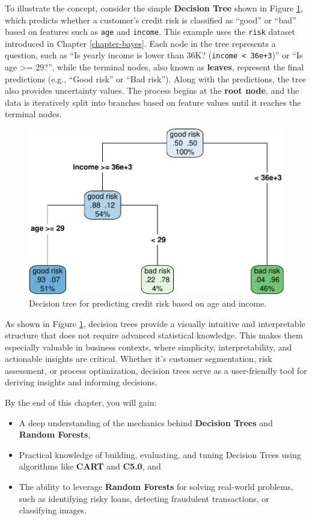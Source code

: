 \documentclass[
]{book}
\newcommand{\passthrough}[1]{#1}
\providecommand{\tightlist}{%
  \setlength{\itemsep}{0pt}\setlength{\parskip}{0pt}}
\theoremstyle{definition}
\theoremstyle{definition}
\theoremstyle{definition}
\theoremstyle{definition}
\theoremstyle{remark}
\begin{document}
To illustrate the concept, consider the simple \textbf{Decision Tree} shown in Figure \ref{fig:tree-0}, which predicts whether a customer's credit risk is classified as ``good'' or ``bad'' based on features such as \passthrough{\lstinline!age!} and \passthrough{\lstinline!income!}. This example uses the \passthrough{\lstinline!risk!} dataset introduced in Chapter \ref{chapter-bayes}. Each node in the tree represents a question, such as ``Is yearly income is lower than 36K? (\passthrough{\lstinline!income < 36e+3!})'' or ``Is age \textgreater= 29?'', while the terminal nodes, also known as \textbf{leaves}, represent the final predictions (e.g., ``Good risk'' or ``Bad risk''). Along with the predictions, the tree also provides uncertainty values. The process begins at the \textbf{root node}, and the data is iteratively split into branches based on feature values until it reaches the terminal nodes.

\begin{figure}

{\centering \includegraphics[width=0.65\linewidth]{tree_files/figure-latex/tree-0-1} 

}

\caption{Decision tree for predicting credit risk based on age and income.}\label{fig:tree-0}
\end{figure}

As shown in Figure \ref{fig:tree-0}, decision trees provide a visually intuitive and interpretable structure that does not require advanced statistical knowledge. This makes them especially valuable in business contexts, where simplicity, interpretability, and actionable insights are critical. Whether it's customer segmentation, risk assessment, or process optimization, decision trees serve as a user-friendly tool for deriving insights and informing decisions.

By the end of this chapter, you will gain:

\begin{itemize}
\tightlist
\item
  A deep understanding of the mechanics behind \textbf{Decision Trees} and \textbf{Random Forests},\\
\item
  Practical knowledge of building, evaluating, and tuning Decision Trees using algorithms like \textbf{CART} and \textbf{C5.0}, and\\
\item
  The ability to leverage \textbf{Random Forests} for solving real-world problems, such as identifying risky loans, detecting fraudulent transactions, or classifying images.
\end{itemize}
\end{document}
